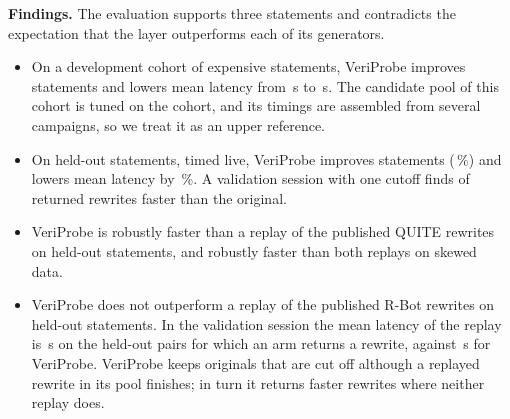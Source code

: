 \documentclass[conference]{IEEEtran}
\newcommand{\sys}{VeriProbe}
\newcommand{\secs}[1]{#1\,s}
\newcommand{\pc}[1]{#1\,\%}
\begin{document}
\textbf{Findings.}
The evaluation supports three statements and contradicts the expectation that the layer outperforms each of its generators.
\begin{itemize}
\item On a development cohort of \DevN{} expensive statements, \sys{} improves \DevOursFaster{} statements and lowers mean latency from \secs{\DevOrigMean} to \secs{\DevOursMean}. The candidate pool of this cohort is tuned on the cohort, and its timings are assembled from several campaigns, so we treat it as an upper reference.
\item On \HeldAllN{} held-out statements, timed live, \sys{} improves \HeldAllOursFaster{} statements (\pc{\HeldAllOursFasterPct}) and lowers mean latency by \pc{\HeldAllOursRedU}. A validation session with one cutoff finds \ValHeldAllOursFaster{} of \ValHeldAllOursRewrites{} returned rewrites faster than the original.
\item \sys{} is robustly faster than a replay of the published QUITE rewrites on held-out statements, and robustly faster than both replays on skewed data.
\item \sys{} does not outperform a replay of the published R-Bot rewrites on held-out statements. In the validation session the mean latency of the replay is \secs{\ValHeldAllRbotMean} on the \ValHeldAllDone{} held-out pairs for which an arm returns a rewrite, against \secs{\ValHeldAllOursMean} for \sys{}. \sys{} keeps \ValHeldAllMissedOrigCutOff{} originals that are cut off although a replayed rewrite in its pool finishes; in turn it returns \ValHeldAllOursOnly{} faster rewrites where neither replay does.
\end{itemize}
\end{document}
